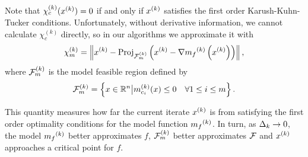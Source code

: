 \documentclass{article}
\begin{document}
Note that $\chi_c^{(k)}(x^{(k)}) = 0$ if and only if $x^{(k)}$ satisfies the first order Karush-Kuhn-Tucker conditions.
Unfortunately,  without derivative information, we cannot calculate $\chi_c^{(k)}$ directly, so in our algorithms we approximate it with
\begin{align}
\label{define_criticality_measure}
{\chi_m^{(k)}} = \left\|x^{(k)} - {\textrm{Proj}}_{{\mathcal F_m^{(k)}}}\left(x^{(k)}- \nabla {{m}_f}^{(k)}\left(x^{(k)}\right)\right)\right\|,
\end{align}
where ${\mathcal F_m^{(k)}}$ is the model feasible region defined by
\begin{align}
{\mathcal F_m^{(k)}} = \left\{x \in \mathbb R^n \big| {{m}^{(k)}_{c_i}}(x) \le 0 \quad \forall 1 \le i \le m \right\}.  \label{define_feasiblek}
\end{align}

This quantity measures how far the current iterate $x^{(k)}$ is from satisfying the first order optimality conditions for the model function ${{m}_f}^{(k)}$.
In turn, as $\Delta_k \to 0$, the model ${{m}_f}^{(k)}$ better approximates $f$, ${\mathcal F_m^{(k)}}$ better approximates ${\mathcal F}$ and $x^{(k)}$ approaches a critical point for $f$.





%
%
%
\end{document}
